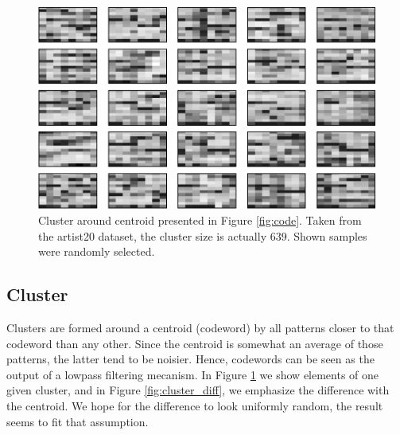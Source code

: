 \documentclass{article}
\begin{document}
\begin{figure}[htb]
\begin{center}
\includegraphics[width=.9\columnwidth]{close_patterns1}
\end{center}
\caption{\small{Cluster around centroid presented in
Figure \ref{fig:code}. Taken from the artist20 dataset, the cluster
size is actually $639$. Shown samples were randomly selected.
}}
\label{fig:cluster}
\end{figure}

\subsection{Cluster}
Clusters are formed around a centroid (codeword) by all patterns closer
to that codeword than any other. Since the centroid is somewhat an
average of those patterns, the latter tend to be noisier. Hence, codewords
can be seen as the output of a lowpass filtering mecanism.
In Figure \ref{fig:cluster} we show elements of one given
cluster, and in Figure \ref{fig:cluster_diff}, we emphasize the difference
with the centroid. We hope for the difference to look uniformly random,
the result seems to fit that assumption.

\end{document}
